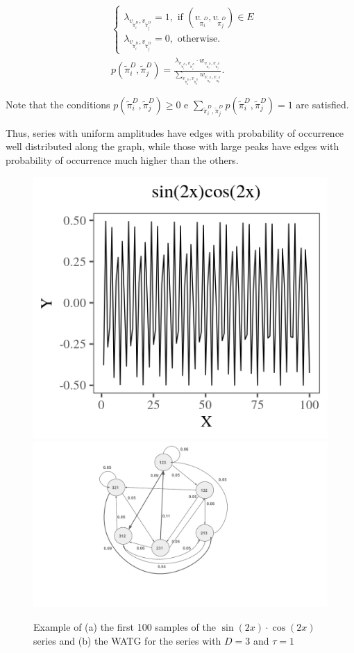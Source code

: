 \documentclass[paper=letter, fontsize=12pt]{article}
\begin{document}
\begin{align}
&\left\{\begin{array}{l}
\lambda_{v_{\widetilde\pi^D_i}, v_{\widetilde\pi^D_j}} = 1, \text{ if } (v_{\widetilde\pi^D_i}, v_{\widetilde\pi^D_j}) \in {E} \\
\lambda_{v_{\widetilde\pi^D_i}, v_{\widetilde\pi^D_j}} = 0, \text{ otherwise}.
\end{array}\right. \\
%
&p(\widetilde\pi^D_i, \widetilde\pi^D_j) = \frac{\lambda_{v_{\widetilde\pi^D_i}, v_{\widetilde\pi^D_j}} \cdot w_{v_{\widetilde\pi^D_i}, v_{\widetilde\pi^D_j}}}{\sum_{v_{\widetilde\pi^D_a}, v_{\widetilde\pi^D_b}} w_{v_{\widetilde\pi^D_a}, v_{\widetilde\pi^D_b}}}.
\end{align}

Note that the conditions $p(\widetilde\pi^D_i, \widetilde\pi^D_j) \ge 0$ e $\sum_{\widetilde\pi^D_i, \widetilde\pi^D_j} p(\widetilde\pi^D_i, \widetilde\pi^D_j) = 1$ are satisfied.

Thus, series with uniform amplitudes have edges with probability of occurrence well distributed along the graph, while those with large peaks have edges with probability of occurrence much higher than the others.

\begin{figure}[hbt]
	\centering
	\includegraphics[width=.45\linewidth]{Figures/plotsincos.png}
	\includegraphics[width=.4\linewidth]{Figures/graph.pdf}
	\caption{Example of (a) the first 100 samples of the $\sin (2x) \cdot \cos (2x)$ series and (b) the WATG for the series with $D = 3$ and $\tau = 1$}\label{fig:series}
\end{figure} 
\end{document}
